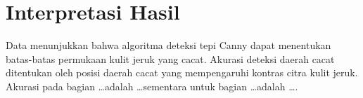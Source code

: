 \documentclass[laporan.tex]{subfiles}
\begin{document}
\section{Interpretasi Hasil}

Data menunjukkan bahwa algoritma deteksi tepi Canny dapat menentukan batas-batas permukaan kulit jeruk yang cacat. Akurasi deteksi daerah cacat ditentukan oleh posisi daerah cacat yang mempengaruhi kontras citra kulit jeruk. Akurasi pada bagian \ldots adalah \ldots sementara untuk bagian \ldots adalah \ldots.


\end{document}
